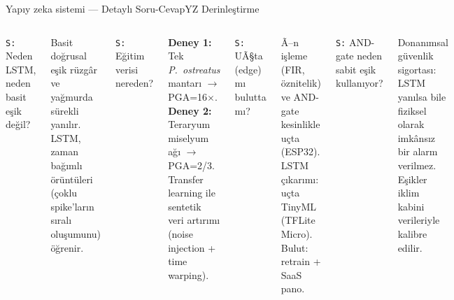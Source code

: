 \documentclass[aspectratio=169,11pt]{beamer}
\begin{document}
\begin{frame}{Yap{\i}y zeka sistemi --- Detayl{\i} Soru-Cevap}{YZ Derinle\c{s}tirme}
  {\scriptsize
  \begin{columns}[T]
      {\color{ember}\texttt{S:}} {\color{sage}Neden LSTM, neden basit e\c{s}ik de\u{g}il?}\par
      {\color{spore} Basit do\u{g}rusal e\c{s}ik r\"uzg\^ar ve ya\u{g}murda s\"urekli yan{\i}l{\i}r. LSTM, zaman ba\u{g}{\i}ml{\i} \"or\"unt\"uleri (\c{c}oklu spike'lar{\i}n s{\i}ral{\i} olu\c{s}umunu) \"o\u{g}renir.}\par
      \vskip4pt
      {\color{ember}\texttt{S:}} {\color{sage}E\u{g}itim verisi nereden?}\par
      {\color{spore} \textbf{Deney 1:} Tek \textit{P.~ostreatus} mantar{\i} $\to$ PGA=16$\times$. \textbf{Deney 2:} Teraryum miselyum a\u{g}{\i} $\to$ PGA=2/3. Transfer learning ile sentetik veri art{\i}r{\i}m{\i} (noise injection + time warping).}\par
      \vskip4pt
      {\color{ember}\texttt{S:}} {\color{sage}UÃ§ta (edge) m{\i} bulutta m{\i}?}\par
      {\color{spore} Ã–n i\c{s}leme (FIR, \"oznitelik) ve AND-gate kesinlikle u\c{c}ta (ESP32). LSTM \c{c}{\i}kar{\i}m{\i}: u\c{c}ta TinyML (TFLite Micro). Bulut: retrain + SaaS pano.}\par
      \vskip4pt
      {\color{ember}\texttt{S:}} {\color{sage}AND-gate neden sabit e\c{s}ik kullan{\i}yor?}\par
      {\color{spore} Donan{\i}msal g\"uvenlik sigortas{\i}: LSTM yan{\i}lsa bile fiziksel olarak imk\^ans{\i}z bir alarm verilmez. E\c{s}ikler iklim kabini verileriyle kalibre edilir.}\par


\end{columns}}
\end{frame}
\end{document}
